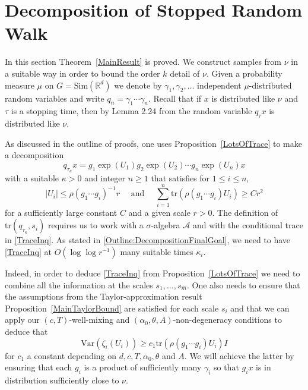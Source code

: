 \documentclass[10pt, english,oneside,reqno]{amsart}
\theoremstyle{plain}
\theoremstyle{remark}
\numberwithin{equation}{section}
\numberwithin{figure}{section}
\newcommand{\tr}{\mathrm{tr}}
\newcommand{\R}{\mathbb{R}}
\newcommand{\Var}{\mathrm{Var}}
\begin{document}
    \section{Decomposition of Stopped Random Walk}

    \label{section:decomposition}


In this section Theorem~\ref{MainResult} is proved. We construct samples from $\nu$ in a suitable way in order to bound the order $k$ detail of $\nu$. Given a probability measure $\mu$ on $G = \mathrm{Sim}(\R^d)$ we denote by $\gamma_1, \gamma_2, \ldots$ independent $\mu$-distributed random variables and write $q_n = \gamma_1 \cdots \gamma_n$. Recall that if $x$ is distributed like $\nu$ and $\tau$ is a stopping time, then by Lemma 2.24 from \cite{Kittle2023} the random variable $q_{\tau}x$ is distributed like $\nu$.

As discussed in the outline of proofs, one uses Proposition~\ref{LotsOfTrace} to make a decomposition 
\begin{equation}\label{Decomposition}
    q_{\tau_{\kappa}}x = g_1\exp(U_1)g_2\exp(U_2)\cdots g_n \exp(U_n)x
\end{equation}
with a suitable $\kappa>0$ and integer $n \geq 1$ that satisfies for $1 \leq i \leq n$, 
\begin{equation}\label{TraceInq}
    |U_i| \leq \rho(g_1\cdots g_i)^{-1}r \quad \text{ and } \quad \sum_{i = 1}^n \tr(\rho(g_1\cdots g_i)U_i) \geq Cr^{2}
\end{equation}
for a sufficiently large constant $C$ and a given scale $r > 0$. The definition of $\mathrm{tr}(q_{\tau_{\kappa}}, s_i)$ requires us to work with a $\sigma$-algebra $\mathscr{A}$ and with the conditional trace in \eqref{TraceInq}. As stated in \eqref{Outline:DecompositionFinalGoal}, we need to have \eqref{TraceInq} at $O(\log \log r^{-1})$ many suitable times $\kappa_i$. 

Indeed, in order to deduce \eqref{TraceInq} from Proposition~\ref{LotsOfTrace} we need to combine all the information at the scales $s_1, \ldots , s_{\hat{m}}$. One also needs to ensure that the assumptions from the Taylor-approximation result Proposition~\ref{MainTaylorBound} are satisfied for each scale $s_i$ and that we can apply our $(c,T)$-well-mixing and $(\alpha_0,\theta,A)$-non-degeneracy conditions to deduce that $$\Var(\zeta_i(U_i)) \geq c_1\mathrm{tr}(\rho(g_1\cdots g_i)U_i)I$$ for $c_1$ a constant depending on $d,c,T,\alpha_0,\theta$ and $A$. We will achieve the latter by ensuring that each $g_i$ is a product of sufficiently many $\gamma_i$ so that $g_ix$ is in distribution sufficiently close to $\nu$.
\end{document}
